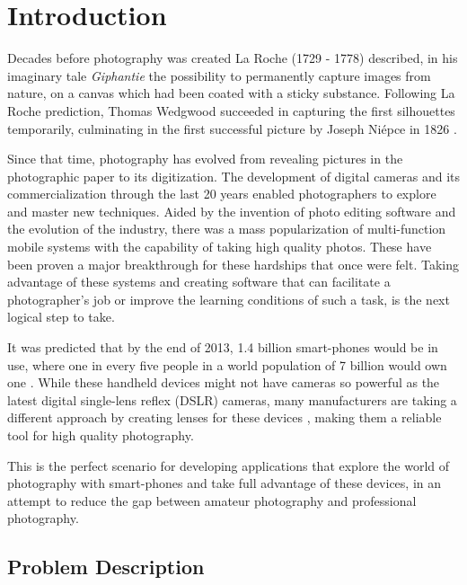 % 
%  
%
\chapter{Introduction}
\label{cha:intro}

Decades before photography was created La Roche (1729 - 1778) described, in his imaginary tale \emph{Giphantie} the possibility to permanently capture images from nature, on a canvas which had been coated with a sticky substance. Following La Roche prediction, Thomas Wedgwood succeeded in capturing the first silhouettes temporarily, culminating in the first successful picture by Joseph Niépce in 1826 \cite{Leggat1995}. 

Since that time, photography has evolved from revealing pictures in the photographic paper to its digitization. The development of digital cameras and its commercialization through the last 20 years enabled photographers to explore and master new techniques.
Aided by the invention of photo editing software and the evolution of the industry, there was a mass popularization of multi-function mobile systems with the capability of taking high quality photos. These have been proven a major breakthrough for these hardships that once were felt.
Taking advantage of these systems and creating software that can facilitate a photographer's job or improve the learning conditions of such a task, is the next logical step to take.

It was predicted that by the end of 2013, 1.4 billion smart-phones would be in use, where one in every five people in a world population of 7 billion would own one \cite{Leonard2013}. While these handheld devices might not have cameras so powerful as the latest digital single-lens reflex (DSLR) cameras, many manufacturers are taking a different approach by creating lenses for these devices \cite{Bolton2013}, making them a reliable tool for high quality photography.

This is the perfect scenario for developing applications that explore the world of photography with smart-phones and take full advantage of these devices, in an attempt to reduce the gap between amateur photography and professional photography.

\section{Problem Description}

